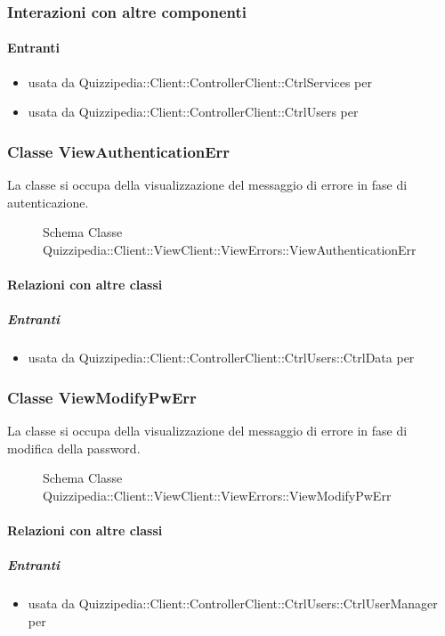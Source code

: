\subsubsection{Interazioni con altre componenti}
\paragraph{Entranti}
\begin{itemize}
\item usata da Quizzipedia::Client::ControllerClient::CtrlServices per 
\item usata da Quizzipedia::Client::ControllerClient::CtrlUsers per 
\end{itemize}
\subsubsection{Classe ViewAuthenticationErr}
La classe si occupa della visualizzazione del messaggio di errore in fase di autenticazione.
\begin{figure}[H]
\centering
\noindent{}
\caption[Schema Classe ViewAuthenticationErr]{Schema Classe Quizzipedia::Client::ViewClient::ViewErrors::ViewAuthenticationErr}
\end{figure}
\paragraph{Relazioni con altre classi}
\subparagraph{Entranti}
\begin{itemize}
\item usata da Quizzipedia::Client::ControllerClient::CtrlUsers::CtrlData per 
\end{itemize}
\subsubsection{Classe ViewModifyPwErr}
La classe si occupa della visualizzazione del messaggio di errore in fase di modifica della password.
\begin{figure}[H]
\centering
\noindent{}
\caption[Schema Classe ViewModifyPwErr]{Schema Classe Quizzipedia::Client::ViewClient::ViewErrors::ViewModifyPwErr}
\end{figure}
\paragraph{Relazioni con altre classi}
\subparagraph{Entranti}
\begin{itemize}
\item usata da Quizzipedia::Client::ControllerClient::CtrlUsers::CtrlUserManager per 
\end{itemize}
